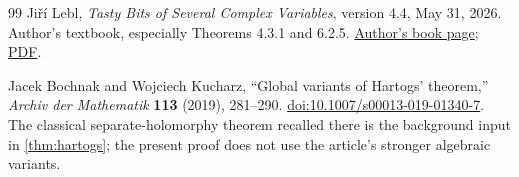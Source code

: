 \documentclass[11pt,oneside]{article}
\numberwithin{equation}{section}
\theoremstyle{definition}
\theoremstyle{remark}\newtheorem{remark}[theorem]{Remark}
\begin{document}
\begin{thebibliography}{99}
Ji\v r\'i Lebl,
\emph{Tasty Bits of Several Complex Variables}, version 4.4, May 31, 2026.
Author's textbook, especially Theorems 4.3.1 and 6.2.5.
\href{https://www.jirka.org/scv/}{Author's book page};
\href{https://www.jirka.org/scv/scv.pdf}{PDF}.

Jacek Bochnak and Wojciech Kucharz,
``Global variants of Hartogs' theorem,''
\emph{Archiv der Mathematik} \textbf{113} (2019), 281--290.
\href{https://doi.org/10.1007/s00013-019-01340-7}{doi:10.1007/s00013-019-01340-7}.
The classical separate-holomorphy theorem recalled there is the background input in \cref{thm:hartogs}; the present proof does not use the article's stronger algebraic variants.

\end{thebibliography}
\end{document}
